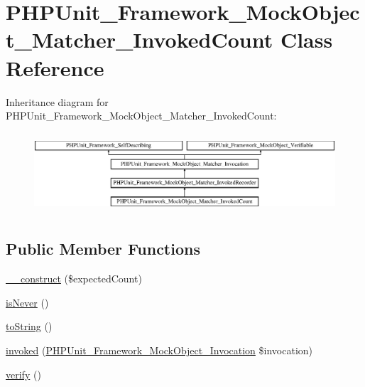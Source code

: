 \hypertarget{class_p_h_p_unit___framework___mock_object___matcher___invoked_count}{}\section{P\+H\+P\+Unit\+\_\+\+Framework\+\_\+\+Mock\+Object\+\_\+\+Matcher\+\_\+\+Invoked\+Count Class Reference}
\label{class_p_h_p_unit___framework___mock_object___matcher___invoked_count}
Inheritance diagram for P\+H\+P\+Unit\+\_\+\+Framework\+\_\+\+Mock\+Object\+\_\+\+Matcher\+\_\+\+Invoked\+Count\+:\begin{figure}[H]
\begin{center}
\leavevmode
\includegraphics[height=3.035230cm]{class_p_h_p_unit___framework___mock_object___matcher___invoked_count}
\end{center}
\end{figure}
\subsection*{Public Member Functions}
\begin{DoxyCompactItemize}
\item 
\mbox{\hyperlink{class_p_h_p_unit___framework___mock_object___matcher___invoked_count_a91b1656c7f6b0a7b3a2cac82d69e5705}{\+\_\+\+\_\+construct}} (\$expected\+Count)
\item 
\mbox{\hyperlink{class_p_h_p_unit___framework___mock_object___matcher___invoked_count_a2e25176b1c85e0184280b407d14116d2}{is\+Never}} ()
\item 
\mbox{\hyperlink{class_p_h_p_unit___framework___mock_object___matcher___invoked_count_a5558c5d549f41597377fa1ea8a1cefa3}{to\+String}} ()
\item 
\mbox{\hyperlink{class_p_h_p_unit___framework___mock_object___matcher___invoked_count_a63f37b06181c9547bc3c225007c34425}{invoked}} (\mbox{\hyperlink{interface_p_h_p_unit___framework___mock_object___invocation}{P\+H\+P\+Unit\+\_\+\+Framework\+\_\+\+Mock\+Object\+\_\+\+Invocation}} \$invocation)
\item 
\mbox{\hyperlink{class_p_h_p_unit___framework___mock_object___matcher___invoked_count_aa33600b6a1b28d0c4dfe4d468272aaa4}{verify}} ()
\end{DoxyCompactItemize}
